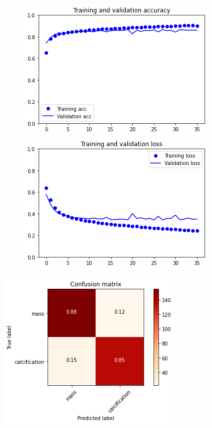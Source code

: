 \documentclass{article}
\begin{document}
\begin{figure}[h]
    \centering
    \begin{minipage}{0.45\textwidth}
        \centering
        \includegraphics[scale=0.46]{./img/preTrainValVGG19_ft.png}
    \end{minipage}\hfill
    \begin{minipage}{0.45\textwidth}
        \centering
        \includegraphics[scale=0.46]{./img/preTrainLossVGG19_ft.png}
    \end{minipage}
\end{figure}

\begin{center}
\begin{minipage}{0.45\textwidth}
        \includegraphics[scale=0.6]{./img/cmPreTrainVGG19_ft.png}
    \end{minipage}
\end{center}
\end{document}
